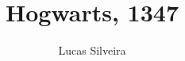 \documentclass[11pt,oneside]{book}
\title{Hogwarts, 1347}
\author{Lucas Silveira}
\date{}
\begin{document}
\renewcommand{\contentsname}{Index}

\frontmatter
\maketitle
\tableofcontents

\mainmatter














\end{document}
